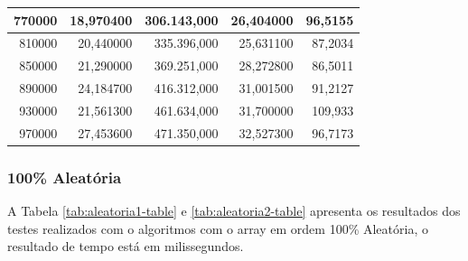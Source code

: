 \documentclass[a4paper, 12pt]{article}
\begin{document}
\begin{longtable}[c]{@{}rrrrr@{}}
	\multicolumn{1}{|r|}{770000}                  & \multicolumn{1}{r|}{18,970400}     & \multicolumn{1}{r|}{306.143,000}   & \multicolumn{1}{r|}{26,404000}     & \multicolumn{1}{r|}{96,5155}       \\* \midrule
	\multicolumn{1}{|r|}{810000}                  & \multicolumn{1}{r|}{20,440000}     & \multicolumn{1}{r|}{335.396,000}   & \multicolumn{1}{r|}{25,631100}     & \multicolumn{1}{r|}{87,2034}       \\* \midrule
	\multicolumn{1}{|r|}{850000}                  & \multicolumn{1}{r|}{21,290000}     & \multicolumn{1}{r|}{369.251,000}   & \multicolumn{1}{r|}{28,272800}     & \multicolumn{1}{r|}{86,5011}       \\* \midrule
	\multicolumn{1}{|r|}{890000}                  & \multicolumn{1}{r|}{24,184700}     & \multicolumn{1}{r|}{416.312,000}   & \multicolumn{1}{r|}{31,001500}     & \multicolumn{1}{r|}{91,2127}       \\* \midrule
	\multicolumn{1}{|r|}{930000}                  & \multicolumn{1}{r|}{21,561300}     & \multicolumn{1}{r|}{461.634,000}   & \multicolumn{1}{r|}{31,700000}     & \multicolumn{1}{r|}{109,933}       \\* \midrule
	\multicolumn{1}{|r|}{970000}                  & \multicolumn{1}{r|}{27,453600}     & \multicolumn{1}{r|}{471.350,000}   & \multicolumn{1}{r|}{32,527300}     & \multicolumn{1}{r|}{96,7173}       \\* \bottomrule
\end{longtable}
\subsubsection{100\% Aleatória}
A Tabela \ref{tab:aleatoria1-table} e \ref{tab:aleatoria2-table}  apresenta os resultados dos testes realizados com o algoritmos com o array em ordem 100\% Aleatória, o resultado de tempo está em milissegundos.
\end{document}
